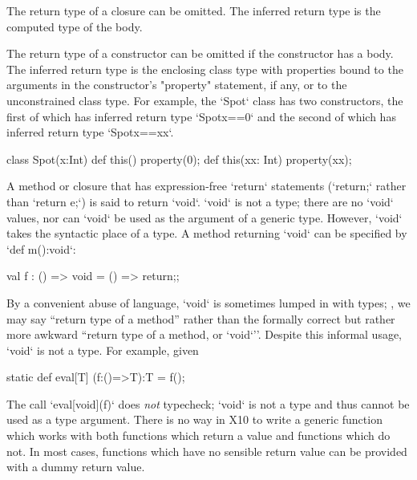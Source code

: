 {The return type of a closure can be omitted.
The inferred return type is the computed type of the body.

The return type of a constructor can be omitted if the
constructor has a body.
The inferred return type is the enclosing class type with
properties bound to the arguments in the constructor's \xcd"property"
statement, if any, or to the unconstrained class type.
For example, the \xcd`Spot` class has two constructors, the first of which has
inferred return type \xcd`Spot{x==0}` and the second of which has 
inferred return type \xcd`Spot{x==xx}`. 
\begin{xten}
class Spot(x:Int) {
  def this() {property(0);}
  def this(xx: Int) { property(xx); }
}
\end{xten}



A method or closure that has expression-free \xcd`return` statements
(\xcd`return;` rather than \xcd`return e;`) is said to return \xcd`void`.
\xcd`void` is not a type; there are no \xcd`void` values, nor can \xcd`void`
be used as the argument of a generic type. However, \xcd`void` takes the
syntactic place of a type. A method returning \xcd`void` can be specified by
\xcd`def m():void`: 

\begin{xten}
val f : () => void = () => {return;};
\end{xten}

By a convenient abuse of language, \xcd`void` is sometimes
lumped in with types; \eg, we may say ``return type of a method'' rather than
the formally correct but rather more awkward ``return type of a method, or
\xcd`void`''.   Despite this informal usage, \xcd`void` is not a type.  For
example, given 
\begin{xten}
  static def eval[T] (f:()=>T):T = f();
\end{xten}
\noindent
The call \xcd`eval[void](f)` does {\em not} typecheck; \xcd`void` is not a
type and thus cannot be used as a type argument.  There is no way in X10 to
write a generic function which works with both functions which return a value
and functions which do not.  In most cases, functions which have no sensible
return value can be provided with a dummy return value.

}
